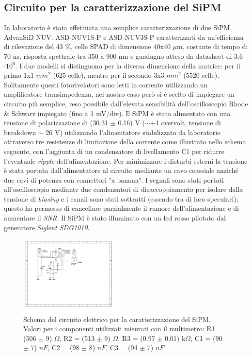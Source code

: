 \documentclass[journal]{IEEEtran}
\begin{document}
\subsection{\textbf{Circuito per la caratterizzazione del SiPM}}
In laboratorio è stata effettuata una semplice caratterizzazione di due SiPM AdvanSiD NUV: ASD-NUV1S-P e ASD-NUV3S-P \cite{I} caratterizzati da un'efficienza di rilevazione del 43 \%, celle SPAD di dimensione 40x40 $\mu$m, costante di tempo di 70 ns, risposta spettrale tra 350 a 900 nm e guadagno atteso da datasheet di 3.6 $\cdot 10^6$. I due modelli si distinguono per la diversa dimensione della matrice: per il primo 1x1 $mm^2$ (625 celle), mentre per il secondo 3x3 $mm^2$ (5520 celle). Solitamente questi fotorivelatori sono letti in corrente utilizzando un amplificatore transimpedenza, nel nostro caso però si è scelto di impiegare un circuito più semplice, reso possibile dall'elevata sensibilità dell'oscilloscopio Rhode & Schwarz impiegato (fino a 1 mV/div). Il SiPM è stato alimentato con una tensione di polarizzazione di (30.31 $\pm$ 0.16) V ($\sim +4$ overvolt, tensione di breakdown $\sim$ 26 V) utilizzando l'alimentatore stabilizzato da laboratorio attraverso tre resistenze di limitazione della corrente come illustrato nello schema seguente, con l'aggiunta di un condensatore di livellamento C1 per ridurre l'eventuale \textit{ripple} dell'alimentazione. Per minimizzare i disturbi esterni la tensione è stata portata dall'alimentatore al circuito mediante un cavo coassiale anziché due cavi di potenza con connettori "a banana". I segnali sono stati portati all'oscilloscopio mediante due condensatori di disaccoppiamento per isolare dalla tensione di \textit{biasing} e i canali sono stati sottratti (essendo tra di loro speculari); questo ha permesso di cancellare parzialmente il rumore dell'alimentazione e di aumentare il \textit{SNR}. Il SiPM è stato illuminato con un led rosso pilotato dal generatore \textit{Siglent SDG1010}.

\begin{figure}[H]%
\begin{center}
\includegraphics[width=0.46\textwidth]{sch-simulations/output/SiPM.pdf}
\caption{Schema del circuito elettrico per la caratterizzazione del SiPM. Valori per i componenti utilizzati misurati con il multimetro: R1 = (506 $\pm$ 9) $\Omega$, R2 = (513 $\pm$ 9) $\Omega$, R3 = (0.97 $\pm$ 0.01) k$\Omega$, C1 = (90 $\pm$ 7) $nF$, C2 = (98 $\pm$ 8) $nF$, C3 = (94 $\pm$ 7) $nF$}
\label{fig:oscilloscope}
\end{center}
\end{figure}
\end{document}

